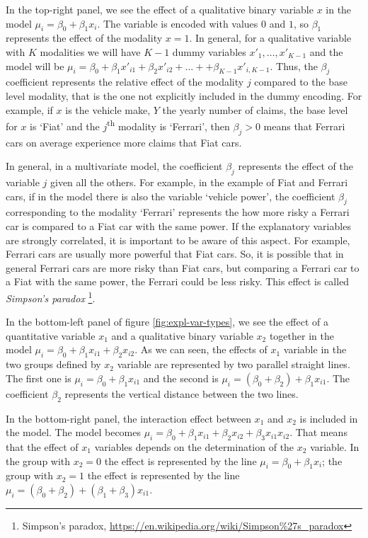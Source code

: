 \documentclass[a4paper, nobind]{templates/ociamthesis}
\theoremstyle{definition}
\theoremstyle{definition}
\theoremstyle{definition}
\theoremstyle{remark}
\begin{document}
In the top-right panel, we see the effect of a qualitative binary variable \(x\) in the model \(\mu_i = \beta_0 + \beta_1 x_i\). The variable is encoded with values \(0\) and \(1\), so \(\beta_1\) represents the effect of the modality \(x=1\). In general, for a qualitative variable with \(K\) modalities we will have \(K-1\) dummy variables \(x'_1, \dots, x'_{K-1}\) and the model will be \(\mu_i = \beta_0 + \beta_1 x'_{i1} + \beta_2 x'_{i2} + \dots + + \beta_{K-1} x'_{i, K-1}\). Thus, the \(\beta_j\) coefficient represents the relative effect of the modality \(j\) compared to the base level modality, that is the one not explicitly included in the dummy encoding. For example, if \(x\) is the vehicle make, \(Y\) the yearly number of claims, the base level for \(x\) is `Fiat' and the \(j\)\textsuperscript{th} modality is `Ferrari', then \(\beta_j>0\) means that Ferrari cars on average experience more claims that Fiat cars.

In general, in a multivariate model, the coefficient \(\beta_j\) represents the effect of the variable \(j\) given all the others. For example, in the example of Fiat and Ferrari cars, if in the model there is also the variable `vehicle power', the coefficient \(\beta_j\) corresponding to the modality `Ferrari' represents the how more risky a Ferrari car is compared to a Fiat car with the same power. If the explanatory variables are strongly correlated, it is important to be aware of this aspect. For example, Ferrari cars are usually more powerful that Fiat cars. So, it is possible that in general Ferrari cars are more risky than Fiat cars, but comparing a Ferrari car to a Fiat with the same power, the Ferrari could be less risky. This effect is called \emph{Simpson's paradox} \footnote{Simpson's paradox, \url{https://en.wikipedia.org/wiki/Simpson\%27s_paradox}}.

In the bottom-left panel of figure \ref{fig:expl-var-types}, we see the effect of a quantitative variable \(x_1\) and a qualitative binary variable \(x_2\) together in the model \(\mu_i = \beta_0 + \beta_1 x_{i1} + \beta_2 x_{i2}\). As we can seen, the effects of \(x_1\) variable in the two groups defined by \(x_2\) variable are represented by two parallel straight lines. The first one is \(\mu_i = \beta_0 + \beta_1 x_{i1}\) and the second is \(\mu_i = \left(\beta_0 + \beta_2\right) + \beta_1 x_{i1}\). The coefficient \(\beta_2\) represents the vertical distance between the two lines.

In the bottom-right panel, the interaction effect between \(x_1\) and \(x_2\) is included in the model. The model becomes \(\mu_i = \beta_0 + \beta_1 x_{i1} + \beta_2 x_{i2} + \beta_3 x_{i1} x_{i2}\). That means that the effect of \(x_1\) variables depends on the determination of the \(x_2\) variable. In the group with \(x_2=0\) the effect is represented by the line \(\mu_i = \beta_0 + \beta_1 x_i\); the group with \(x_2=1\) the effect is represented by the line \(\mu_i = \left(\beta_0 + \beta_2\right) + \left(\beta_1 + \beta_3\right) x_{i1}\).
\end{document}
